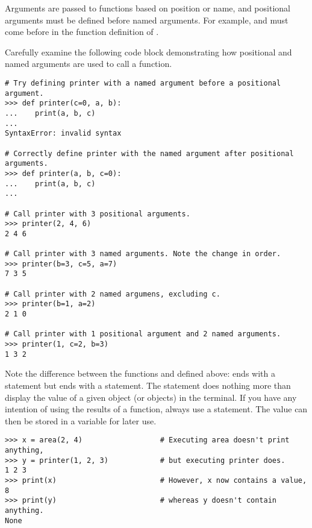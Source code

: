 Arguments are passed to functions based on position or name, and positional arguments must be defined before named arguments.
For example,  and  must come before  in the function definition of .

Carefully examine the following code block demonstrating how positional and named arguments are used to call a function.
\begin{lstlisting}
# Try defining printer with a named argument before a positional argument.
>>> def printer(c=0, a, b):
...    print(a, b, c)
...
SyntaxError: invalid syntax

# Correctly define printer with the named argument after positional arguments.
>>> def printer(a, b, c=0):
...    print(a, b, c)
...

# Call printer with 3 positional arguments.
>>> printer(2, 4, 6)
2 4 6

# Call printer with 3 named arguments. Note the change in order.
>>> printer(b=3, c=5, a=7)
7 3 5

# Call printer with 2 named argumens, excluding c.
>>> printer(b=1, a=2)
2 1 0

# Call printer with 1 positional argument and 2 named arguments.
>>> printer(1, c=2, b=3)
1 3 2
\end{lstlisting}

Note the difference between the functions  and  defined above:  ends with a  statement but  ends with a  statement.
The  statement does nothing more than display the value of a given object (or objects) in the terminal.
If you have any intention of using the results of a function, always use a  statement.
The value can then be stored in a variable for later use.

\begin{lstlisting}
>>> x = area(2, 4)                  # Executing area doesn't print anything,
>>> y = printer(1, 2, 3)            # but executing printer does.
1 2 3
>>> print(x)                        # However, x now contains a value,
8
>>> print(y)                        # whereas y doesn't contain anything.
None
\end{lstlisting}

\begin{comment}   %
The most general form of a function definition is as follows.
\begin{lstlisting}
def fn(*args, **kwargs):
\end{lstlisting}
This means that ``\li{fn} accepts arguments and keyword arguments.''
The arguments, \li{args}, are stored as a tuple; the keyword arguments, \li{kwargs}, are stored as a dictionary.
Such functions can accept any number of arguments and keyword arguments.
\begin{lstlisting}
>>> def fn(*args, **kwargs):
...     print "Positional: ", args
...     print "Keyword: ", kwargs
...     
>>> fn("Hello", 2, 1, apples = 3, oranges = 2)
<<Positional: ('Hello', 2, 1)
Keyword: {'apples': 3, 'oranges': 2}>>
\end{lstlisting}
\end{comment}

